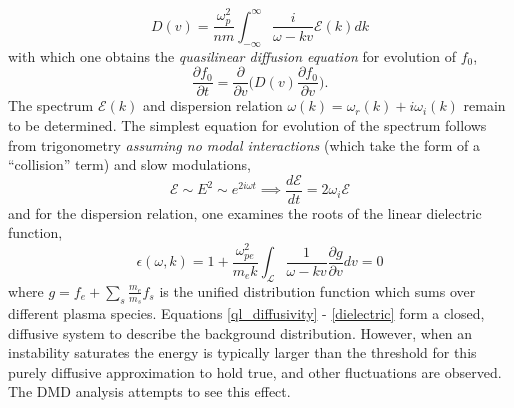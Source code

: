 \documentclass{article}
\begin{document}
\begin{equation}
  D(v) = \frac{\omega_p^2}{nm}\int_{-\infty}^\infty\frac{i}{\omega - kv}\mathcal{E}(k)dk\label{ql_diffusivity}
\end{equation}
with which one obtains the \textit{quasilinear diffusion equation} for evolution of $f_0$,
\begin{equation}
  \frac{\partial f_0}{\partial t} = \frac{\partial}{\partial v}\Big(D(v)\frac{\partial f_0}{\partial v}\Big)\label{ql_equation}.
\end{equation}
The spectrum $\mathcal{E}(k)$ and dispersion relation $\omega(k) = \omega_r(k) + i\omega_i(k)$ remain to be determined. The simplest equation for evolution of the spectrum follows from trigonometry \textit{assuming no modal interactions} (which take the form of a ``collision'' term) and slow modulations,
\begin{equation}
  \mathcal{E}\sim E^2\sim e^{2i\omega t}\implies \frac{d\mathcal{E}}{dt} = 2\omega_i\mathcal{E}\label{spect}
\end{equation}
and for the dispersion relation, one examines the roots of the linear dielectric function,
\begin{equation}
  \epsilon(\omega, k) = 1 + \frac{\omega_{pe}^2}{m_ek}\int_{\mathcal{L}}\frac{1}{\omega - kv}\frac{\partial g}{\partial v}dv = 0\label{dielectric}
\end{equation}
where $g = f_e + \sum_s\frac{m_e}{m_s}f_s$ is the unified distribution function which sums over different plasma species. Equations \ref{ql_diffusivity} - \ref{dielectric} form a closed, diffusive system to describe the background distribution. However, when an instability saturates the energy is typically larger than the threshold for this purely diffusive approximation to hold true, and other fluctuations are observed. The DMD analysis attempts to see this effect.
\end{document}
